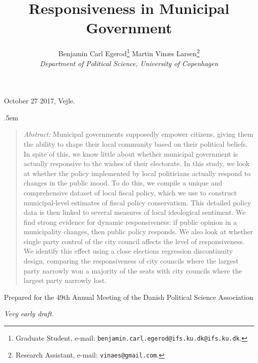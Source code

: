 \documentclass[a4paper,11pt]{article}
\title{\bigskip \bigskip \sffamily \LARGE Responsiveness in Municipal Government}
\author{\bigskip Benjamin Carl Egerod\footnote{Graduate Student, e-mail: \texttt{benjamin.carl.egerod@ifs.ku.dk@ifs.ku.dk}.} \qquad Martin Vinæs Larsen\footnote{Research Assistant, e-mail: \texttt{vinaes@gmail.com}.} \\ \textit{Department of Political Science, University of Copenhagen}} %
\makeatletter
\renewcommand{\maketitle}{
	\begin{flushleft}
		
		\onehalfspacing
		
		\@title
		
		\lineskip .5em
		\normalfont{\normalsize{\@author}}
\end{flushleft}}
\makeatother
\begin{document}
	
	
	
	
	\begin{footnotesize} \noindent October 27 2017, Vejle. \end{footnotesize} %
	
	\vspace{0.7in}
	
	\maketitle
	
	\bigskip
	
	\begin{quotation} %

		\small \noindent \emph{Abstract:} Municipal governments supposedly empower citizens, giving them the ability to shape their local community based on their political beliefs. In spite of this, we know little about whether municipal government is actually responsive to the wishes of their electorate. In this study, we look at whether the policy implemented by local politicians actually respond to changes in the public mood. To do this, we compile a unique and comprehensive dataset of local fiscal policy, which we use to construct municipal-level estimates of fiscal policy conservatism. This detailed policy data is then linked to several measures of local ideological sentiment. We find strong evidence for dynamic responsiveness: if public opinion in a municipality changes, then public policy responds. We also look at whether single party control of the city council affects the level of responsiveness. We identify this effect using a close elections regression discontinuity design, comparing the responsiveness of city councils where the largest party narrowly won a majority of the seats with city councils where the largest party narrowly lost.
	\end{quotation}

\bigskip

\bigskip

\bigskip
	
	
	\noindent Prepared for the 49th Annual Meeting of the Danish Political Science Association \newline 
	
	\thispagestyle{empty} %
	
	
	\bigskip
	
		\noindent \textit{Very early draft.}
	
	\bigskip
	
\end{document}
